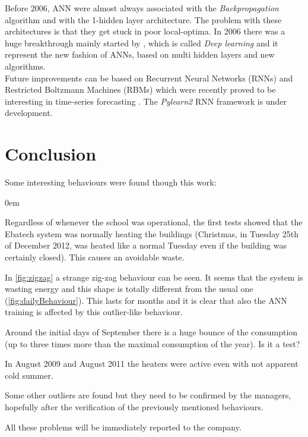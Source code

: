 \documentclass{sig-alternate-sigmod07}
\begin{document}
Before 2006, ANN were almost always associated with the \emph{Backpropagation} algorithm and with the 1-hidden layer architecture. The problem with these architectures is that they get stuck in poor local-optima. In 2006 there was a huge breakthrough mainly started by \cite{hinton2006fast}, which is called \emph{Deep learning} and it represent the new fashion of ANNs, based on multi hidden layers and new algorithms. \\
Future improvements can be based on Recurrent Neural Networks (RNNs) and Restricted Boltzmann Machines (RBMs) which were recently proved to be interesting in time-series forecasting \cite{busseti2012deep, taylor2009factored, sutskever2013training}. The \emph{Pylearn2} \cite{goodfellow2013pylearn2} RNN framework is under development.


\section{Conclusion}

Some interesting behaviours were found though this work:
\begin{description}
\itemsep0em
  \item[Holidays] Regardless of whenever the school was operational, the first tests showed that the Ebatech system was normally heating the buildings (Christmas, in Tuesday 25th of December 2012, was heated like a normal Tuesday even if the building was certainly closed). This causes an avoidable waste.
  \item[Consumption bounces] In \cref{fig:zigzag} a strange zig-zag behaviour can be seen. It seems that the system is wasting energy and this shape is totally different from the usual one (\cref{fig:dailyBehaviour}). This lasts for months and it is clear that also the ANN training is affected by this outlier-like behaviour.
\item[Peaks] Around the initial days of September there is a huge bounce of the consumption (up to three times more than the maximal consumption of the year). Is it a test?
\item[August with heaters] In August 2009 and August 2011 the heaters were active even with not apparent cold summer.
\item[Outliers] Some other outliers are found but they need to be confirmed by the managers, hopefully after the verification of the previously mentioned behaviours.
\end{description}
All these problems will be immediately reported to the company.
\end{document}
